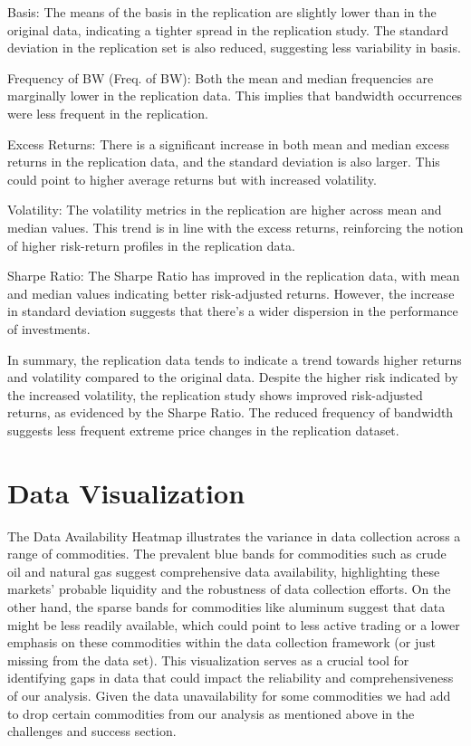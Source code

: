 \documentclass{article}
\begin{document}
Basis: The means of the basis in the replication are slightly lower than in the original data, indicating a tighter spread in the replication study. The standard deviation in the replication set is also reduced, suggesting less variability in basis.

Frequency of BW (Freq. of BW): Both the mean and median frequencies are marginally lower in the replication data. This implies that bandwidth occurrences were less frequent in the replication.

Excess Returns: There is a significant increase in both mean and median excess returns in the replication data, and the standard deviation is also larger. This could point to higher average returns but with increased volatility.

Volatility: The volatility metrics in the replication are higher across mean and median values. This trend is in line with the excess returns, reinforcing the notion of higher risk-return profiles in the replication data.

Sharpe Ratio: The Sharpe Ratio has improved in the replication data, with mean and median values indicating better risk-adjusted returns. However, the increase in standard deviation suggests that there's a wider dispersion in the performance of investments.

In summary, the replication data tends to indicate a trend towards higher returns and volatility compared to the original data. Despite the higher risk indicated by the increased volatility, the replication study shows improved risk-adjusted returns, as evidenced by the Sharpe Ratio. The reduced frequency of bandwidth suggests less frequent extreme price changes in the replication dataset.

\section{Data Visualization}

The Data Availability Heatmap illustrates the variance in data collection across a range of commodities. The prevalent blue bands for commodities such as crude oil and natural gas suggest comprehensive data availability, highlighting these markets' probable liquidity and the robustness of data collection efforts. On the other hand, the sparse bands for commodities like aluminum suggest that data might be less readily available, which could point to less active trading or a lower emphasis on these commodities within the data collection framework (or just missing from the data set). This visualization serves as a crucial tool for identifying gaps in data that could impact the reliability and comprehensiveness of our analysis. Given the data unavailability for some commodities we had add to drop certain commodities from our analysis as mentioned above in the challenges and  success section. 
\end{document}
